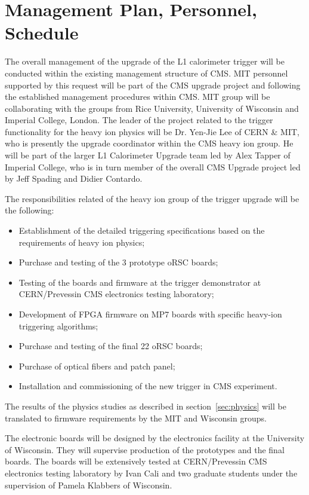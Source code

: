 \section{Management Plan, Personnel, Schedule}
\label{sec:management}

The overall management of the upgrade of the L1 calorimeter trigger will be conducted within the existing management structure of CMS. MIT personnel supported by this request will be part of the CMS upgrade project and following the established management procedures within CMS. MIT group will be collaborating with the groups from Rice University, University of Wisconsin and Imperial College, London. The leader of the project related to the trigger functionality for the heavy ion physics will be Dr. Yen-Jie Lee of CERN \& MIT, who is presently the upgrade coordinator within the CMS heavy ion group. He will be part of the larger L1 Calorimeter Upgrade team led by Alex Tapper of Imperial College, who is in turn member of the overall CMS Upgrade project led by Jeff Spading and Didier Contardo.

The responsibilities related of the heavy ion group of the trigger upgrade will be the following:

\begin{itemize}
\item Establishment of the detailed triggering specifications based on the requirements of heavy ion physics;
\item Purchase and testing of the 3 prototype oRSC boards;
\item Testing of the boards and firmware at the trigger demonstrator at CERN/Prevessin CMS electronics testing laboratory;
\item Development of FPGA firmware on MP7 boards with specific heavy-ion triggering algorithms;
\item Purchase and testing of the final 22 oRSC boards;
\item Purchase of optical fibers and patch panel;
\item Installation and commissioning of the new trigger in CMS experiment.
\end{itemize}

The results of the physics studies as described in section~\ref{sec:physics} will be translated to firmware requirements by the MIT and Wisconsin groups.

The electronic boards will be designed by the electronics facility at the University of Wisconsin. They will supervise production of the prototypes and the final boards. The boards will be extensively tested at CERN/Prevessin CMS electronics testing laboratory by Ivan Cali and two graduate students under the supervision of Pamela Klabbers of Wisconsin. 

